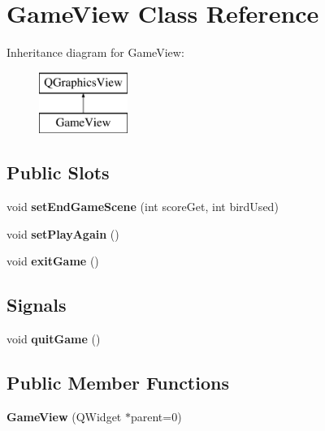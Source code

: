 \hypertarget{classGameView}{}\section{Game\+View Class Reference}
\label{classGameView}
Inheritance diagram for Game\+View\+:\begin{figure}[H]
\begin{center}
\leavevmode
\includegraphics[height=2.000000cm]{classGameView}
\end{center}
\end{figure}
\subsection*{Public Slots}
\begin{DoxyCompactItemize}
\item 
void {\bfseries set\+End\+Game\+Scene} (int score\+Get, int bird\+Used)\hypertarget{classGameView_a90b6c5b6b154f1c455ab03522b866fda}{}\label{classGameView_a90b6c5b6b154f1c455ab03522b866fda}

\item 
void {\bfseries set\+Play\+Again} ()\hypertarget{classGameView_a904299204c154220c8051340845eec99}{}\label{classGameView_a904299204c154220c8051340845eec99}

\item 
void {\bfseries exit\+Game} ()\hypertarget{classGameView_aeb490f4e448fac7f2eb24fb39f8227d4}{}\label{classGameView_aeb490f4e448fac7f2eb24fb39f8227d4}

\end{DoxyCompactItemize}
\subsection*{Signals}
\begin{DoxyCompactItemize}
\item 
void {\bfseries quit\+Game} ()\hypertarget{classGameView_a91360001693a1fe1d2a610d7f14a2876}{}\label{classGameView_a91360001693a1fe1d2a610d7f14a2876}

\end{DoxyCompactItemize}
\subsection*{Public Member Functions}
\begin{DoxyCompactItemize}
\item 
{\bfseries Game\+View} (Q\+Widget $\ast$parent=0)\hypertarget{classGameView_a6f41d09f51d2abd6abb3b99e5da8ef6f}{}\label{classGameView_a6f41d09f51d2abd6abb3b99e5da8ef6f}

\end{DoxyCompactItemize}
